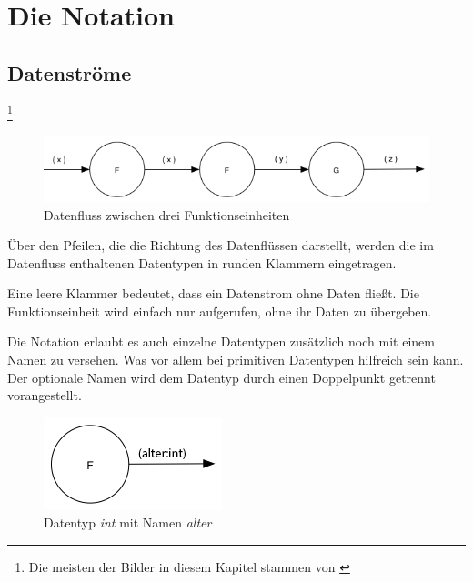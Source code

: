 \newcommand\blfootnote[1]{%
	\begingroup
	\renewcommand\thefootnote{}\footnote{#1}%
	\addtocounter{footnote}{-1}%
	\endgroup
}

\chapter{Die Notation}

\section{Datenströme}

 \blfootnote{Die meisten der Bilder in diesem Kapitel stammen von \cite{flowdesignorg}}
 
\begin{figure}[H]
	\includegraphics[width=1\linewidth]{./img/diagram1.png}
	\caption{Datenfluss zwischen drei Funktionseinheiten}
\end{figure}






Über den Pfeilen, die die Richtung des Datenflüssen darstellt, werden die im
Datenfluss enthaltenen Datentypen in runden Klammern eingetragen.

Eine leere Klammer bedeutet, dass ein Datenstrom ohne Daten fließt.
Die Funktionseinheit wird einfach nur aufgerufen, ohne ihr Daten zu übergeben.


Die Notation erlaubt es auch einzelne Datentypen zusätzlich noch mit einem Namen
zu versehen. Was vor allem bei primitiven Datentypen hilfreich sein kann. 
Der optionale Namen wird dem Datentyp durch einen Doppelpunkt getrennt vorangestellt.

\begin{figure}[H]
	\centering
	\includegraphics[width=.4\linewidth]{./img/diagramNamedType.png}
	\caption{Datentyp \textit{int} mit Namen \textit{alter}}
\end{figure}


